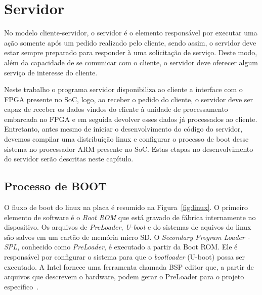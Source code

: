 \chapter{Servidor}

No modelo cliente-servidor, o servidor é o elemento responsável por executar uma ação somente após um pedido realizado pelo cliente, sendo assim, o servidor deve estar sempre preparado para responder à uma solicitação de serviço. Deste modo, além da capacidade de se comunicar com o cliente, o servidor deve oferecer algum serviço de interesse do cliente. 

Neste trabalho o programa servidor disponibiliza ao cliente a interface com o FPGA presente no SoC, logo, ao receber o pedido do cliente, o servidor deve ser capaz de receber os dados vindos do cliente à unidade de processamento embarcada no FPGA e em seguida devolver esses dados já processados ao cliente. Entretanto, antes mesmo de iniciar o desenvolvimento do código do servidor, devemos compilar uma distribuição linux e configurar o processo de boot desse sistema no processador ARM presente no SoC. Estas etapas no desenvolvimento do servidor serão descritas neste capítulo.

\section{Processo de BOOT}
O fluxo de boot do linux na placa é resumido na Figura~\ref{fig:linux}. O primeiro elemento de software é o \textit{Boot ROM} que está gravado de fábrica internamente no dispositivo. Os arquivos de \textit{PreLoader},\textit{ U-boot} e do sistemas de aquivos do linux são salvos em um cartão de memória micro SD\@. O \textit{Secondary Program Loader - SPL}, conhecido como \textit{PreLoader}, é executado a partir da Boot ROM\@. Ele é responsável por configurar o sistema para que o \textit{bootloader} (U-boot) possa ser executado. A Intel fornece uma ferramenta chamada BSP editor que, a partir de arquivos que descrevem o hardware, podem gerar o PreLoader para o projeto específico~\cite{SocLinux}.  

